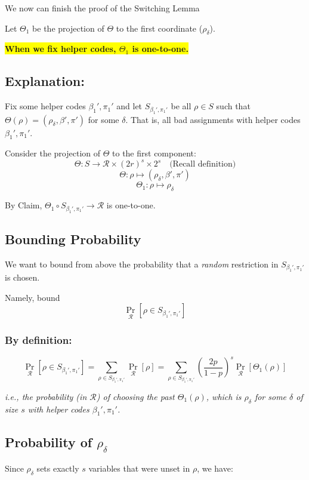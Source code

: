 We now can finish the proof of the Switching Lemma


Let \( \Theta_1 \) be the projection of \( \Theta \) to the first coordinate (\(\rho_{\delta}\)).

\begin{center}
    \colorbox{yellow}{\textbf{When we fix helper codes, \( \Theta_1 \) is one-to-one.}}
\end{center}

\subsection*{Explanation:}
Fix some helper codes \( \beta_1', \pi_1' \) and let \( S_{\beta_1', \pi_1'} \) be all \( \rho \in S \) such that \( \Theta(\rho) = (\rho_{\delta}, \beta', \pi') \) for some \( \delta \). That is, all bad assignments with helper codes \( \beta_1', \pi_1' \).

Consider the projection of \( \Theta \) to the first component:
\[
\Theta: S \to \mathcal{R} \times (2r)^s \times 2^s \quad \text{(Recall definition)}
\]
\[
\Theta: \rho \mapsto (\rho_{\delta}, \beta', \pi')
\]
\[
\Theta_1: \rho \mapsto \rho_{\delta}
\]

By Claim, \( \Theta_1 \circ S_{\beta_1',\pi_1'} \to \mathcal{R} \) is one-to-one.

\subsection*{Bounding Probability}
We want to bound from above the probability that a \textit{random} restriction in \( S_{\beta_1', \pi_1'} \) is chosen.

Namely, bound
\[
\Pr_{\mathcal{R}} [\rho \in S_{\beta_1', \pi_1'}]
\]

\subsubsection*{By definition:}
\[
\Pr_{\mathcal{R}} [\rho \in S_{\beta_1', \pi_1'}] = \sum_{\rho \in S_{\beta_1', \pi_1'}} \Pr_{\mathcal{R}} [\rho] = \sum_{\rho \in S_{\beta_1', \pi_1'}} \left( \frac{2p}{1-p} \right)^s \Pr_{\mathcal{R}} [\Theta_1(\rho)]
\]

\textit{i.e., the probability (in \( \mathcal{R} \)) of choosing the past \( \Theta_1(\rho) \), which is \( \rho_{\delta} \) for some \( \delta \) of size \( s \) with helper codes \( \beta_1', \pi_1' \).}

\subsection*{Probability of \( \rho_{\delta} \)}
Since \( \rho_{\delta} \) sets exactly \( s \) variables that were unset in \( \rho \), we have:

